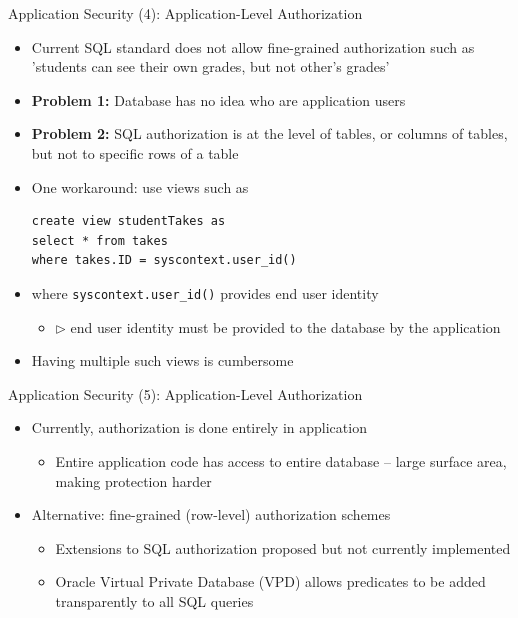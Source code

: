 \documentclass[aspectratio=169, xcolor=dvipsnames]{beamer}
\begin{document}
\begin{frame}[fragile]{Application Security (4): Application-Level Authorization}
    \begin{itemize}
        \item Current SQL standard does not allow fine-grained authorization such as 'students can see their own grades, but not other's grades'
        \item \textbf{Problem 1:} Database has no idea who are application users
        \item \textbf{Problem 2:} SQL authorization is at the level of tables, or columns of tables, but not to specific rows of a table
        \item One workaround: use views such as
        \begin{verbatim}
create view studentTakes as
select * from takes
where takes.ID = syscontext.user_id()
        \end{verbatim}
        \item where \texttt{syscontext.user\_id()} provides end user identity
        \begin{itemize}
            \item $\triangleright$ end user identity must be provided to the database by the application
        \end{itemize}
        \item Having multiple such views is cumbersome
    \end{itemize}
\end{frame}

\begin{frame}{Application Security (5): Application-Level Authorization}
    \begin{itemize}[<+->]
        \item Currently, authorization is done entirely in application
        \begin{itemize}
            \item[$\triangleright$] Entire application code has access to entire database -- large surface area, making protection harder
        \end{itemize}
        \item Alternative: fine-grained (row-level) authorization schemes
        \begin{itemize}
            \item[$\triangleright$] Extensions to SQL authorization proposed but not currently implemented
            \item[$\triangleright$] Oracle Virtual Private Database (VPD) allows predicates to be added transparently to all SQL queries
        \end{itemize}
    \end{itemize}
\end{frame}
\end{document}
